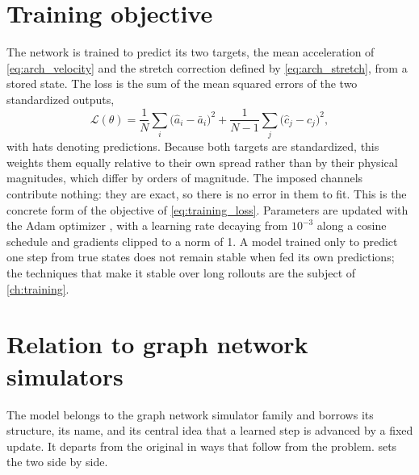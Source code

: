 \section{Training objective}
\label{sec:arch_objective}

The network is trained to predict its two targets, the mean acceleration of \cref{eq:arch_velocity} and the stretch correction defined by \cref{eq:arch_stretch}, from a stored state. The loss is the sum of the mean squared errors of the two standardized outputs,
\begin{equation}
    \mathcal{L}(\theta) = \frac{1}{N}\sum_i \bigl(\hat a_i - \bar a_i\bigr)^2 + \frac{1}{N-1}\sum_j \bigl(\hat c_j - c_j\bigr)^2 ,
    \label{eq:arch_loss}
\end{equation}
with hats denoting predictions. Because both targets are standardized, this weights them equally relative to their own spread rather than by their physical magnitudes, which differ by orders of magnitude. The imposed channels contribute nothing: they are exact, so there is no error in them to fit. This is the concrete form of the objective of \cref{eq:training_loss}. Parameters are updated with the Adam optimizer \cite{kingma2015adam}, with a learning rate decaying from $10^{-3}$ along a cosine schedule and gradients clipped to a norm of 1. A model trained only to predict one step from true states does not remain stable when fed its own predictions; the techniques that make it stable over long rollouts are the subject of \cref{ch:training}.

\section{Relation to graph network simulators}
\label{sec:arch_relation_gns}

The model belongs to the graph network simulator family and borrows its structure, its name, and its central idea that a learned step is advanced by a fixed update. It departs from the original in ways that follow from the problem.  sets the two side by side.

